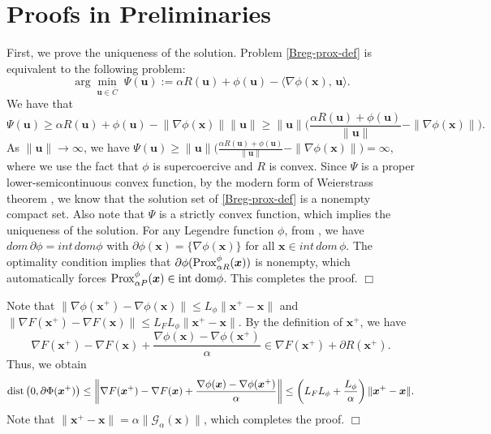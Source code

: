 \documentclass[twoside,11pt]{article}
\newcommand{\cG}{\mathcal G}
\def\norm#1{\left\|#1\right\|}
\def\inprod#1#2{\langle#1,\,#2\rangle}
\def\vu{{\bm{u}}}
\def\vx{{\bm{x}}}
\begin{document}
\section{Proofs in Preliminaries}\label{appendix-preliminary}
First, we prove the uniqueness of the solution. Problem \eqref{Breg-prox-def} is equivalent to the following problem:
\[
\arg\min_{\vu\in\overline{C}}\;\Psi(\vu):=\alpha R(\vu)+\phi(\vu)-\inprod{\nabla\phi(\vx)}{\vu}.
\]
We have that
\[
\Psi(\vu)\geq \alpha R(\vu)
+\phi(\vu)-\norm{\nabla\phi(\vx)}\norm{\vu}
\geq\|\vu\|\Big(\frac{\alpha R(\vu)+\phi(\vu)}{\|\vu\|}-\|\nabla\phi(\vx)\|\Big).
\]
As $\|\vu\|\rightarrow\infty$, we have $\Psi(\vu)\geq\|\vu\|\Big(\frac{\alpha R(\vu)+\phi(\vu)}{\|\vu\|}-\|\nabla\phi(\vx)\|\Big)=\infty$, where we use the fact that $\phi$ is supercoercive and $R$ is convex. Since $\Psi$ is a proper lower-semicontinuous convex function, by the modern form of Weierstrass theorem \cite[Chapter 1]{rockafellar1997convex}, we know that the solution set of \eqref{Breg-prox-def} is a nonempty compact set. Also note that $\Psi$ is a strictly convex function, which implies the uniqueness of the solution. For any Legendre function $\phi$, from \cite[Chapter 26]{rockafellar1997convex}, we have $dom\,\partial\phi=int\,dom\phi$ with $\partial\phi(\vx)=\{\nabla\phi(\vx)\}$ for all $\vx\in int\,dom\,\phi$. The optimality condition implies that $\partial\phi({\rm Prox}^\phi_{\alpha R}(\vx))$ is nonempty, which automatically forces ${\rm Prox}^\phi_{\alpha P}(\vx)\in\text{int\;dom}\phi$. This completes the proof. $\Box$%


 \medskip
  Note that $\|\nabla\phi(\vx^+)-\nabla\phi(\vx)\|\leq L_\phi\|\vx^+-\vx\|$ and $\|\nabla F(\vx^+)-\nabla F(\vx)\|\leq L_FL_\phi\|\vx^+-\vx\|$.
By the definition of $\vx^+$, we have 
\[
\nabla F(\vx^+)-\nabla F(\vx)+\frac{\nabla\phi(\vx)-\nabla\phi(\vx^+)}{\alpha}\in\nabla F(\vx^+)+\partial R(\vx^+).
\]
Thus, we obtain 
\[
{\rm dist}\left(0,\partial\Phi(\vx^+)\right)\leq\bigg\|\nabla F(\vx^+)-\nabla F(\vx)+\frac{\nabla\phi(\vx)-\nabla\phi(\vx^+)}{\alpha}\bigg\|\leq\left(L_FL_\phi+\frac{L_\phi}{\alpha}\right)\|\vx^+-\vx\|.
\]
Note that $\|\vx^+-\vx\|=\alpha\|\cG_\alpha(\vx)\|$, which completes the proof. $\Box$
\end{document}
